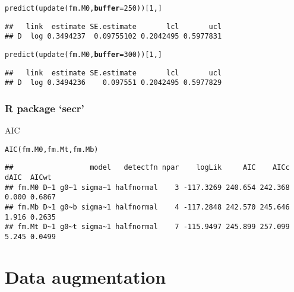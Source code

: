 \documentclass[color=usenames,dvipsnames]{beamer}\usepackage[]{graphicx}\usepackage[]{xcolor}
\makeatletter
\newcommand{\hlnum}[1]{\textcolor[rgb]{0.69,0.494,0}{#1}}%
\newcommand{\hldef}[1]{\textcolor[rgb]{0,0,0}{#1}}%
\newcommand{\hlkwc}[1]{\textcolor[rgb]{0,0,0}{\textbf{#1}}}%
\newcommand{\hlkwd}[1]{\textcolor[rgb]{0.004,0.004,0.506}{#1}}%
\newenvironment{kframe}{%
 \def\at@end@of@kframe{}%
 \ifinner\ifhmode%
  \def\at@end@of@kframe{\end{minipage}}%
  \begin{minipage}{\columnwidth}%
 \fi\fi%
 \def\FrameCommand##1{\hskip\@totalleftmargin \hskip-\fboxsep
 \colorbox{shadecolor}{##1}\hskip-\fboxsep
     \hskip-\linewidth \hskip-\@totalleftmargin \hskip\columnwidth}%
 \MakeFramed {\advance\hsize-\width
   \@totalleftmargin\z@ \linewidth\hsize
   \@setminipage}}%
 {\par\unskip\endMakeFramed%
 \at@end@of@kframe}
\newenvironment{knitrout}{}{} %
\makeatother
\begin{document}
\begin{frame}[fragile]
\begin{knitrout}
\begin{kframe}
\begin{alltt}
\hlkwd{predict}\hldef{(}\hlkwd{update}\hldef{(fm.M0,} \hlkwc{buffer}\hldef{=}\hlnum{250}\hldef{))[}\hlnum{1}\hldef{,]}
\end{alltt}
\begin{verbatim}
##   link  estimate SE.estimate       lcl       ucl
## D  log 0.3494237  0.09755102 0.2042495 0.5977831
\end{verbatim}
\end{kframe}
\end{knitrout}
\pause
\vspace{-12pt}
\begin{knitrout}\scriptsize
{}\color{fgcolor}\begin{kframe}
\begin{alltt}
\hlkwd{predict}\hldef{(}\hlkwd{update}\hldef{(fm.M0,} \hlkwc{buffer}\hldef{=}\hlnum{300}\hldef{))[}\hlnum{1}\hldef{,]}
\end{alltt}
\begin{verbatim}
##   link  estimate SE.estimate       lcl       ucl
## D  log 0.3494236    0.097551 0.2042495 0.5977829
\end{verbatim}
\end{kframe}
\end{knitrout}
\end{frame}



\begin{frame}[fragile]
  \frametitle{R package `secr'}
  AIC
\begin{knitrout}\tiny
{}\color{fgcolor}\begin{kframe}
\begin{alltt}
\hlkwd{AIC}\hldef{(fm.M0, fm.Mt, fm.Mb)}
\end{alltt}
\begin{verbatim}
##                  model   detectfn npar    logLik     AIC    AICc  dAIC  AICwt
## fm.M0 D~1 g0~1 sigma~1 halfnormal    3 -117.3269 240.654 242.368 0.000 0.6867
## fm.Mb D~1 g0~b sigma~1 halfnormal    4 -117.2848 242.570 245.646 1.916 0.2635
## fm.Mt D~1 g0~t sigma~1 halfnormal    7 -115.9497 245.899 257.099 5.245 0.0499
\end{verbatim}
\end{kframe}
\end{knitrout}
\end{frame}


\section{Data augmentation}
\end{document}
